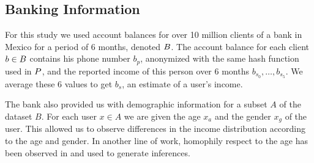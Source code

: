 \subsection{Banking Information}


For this study we used account balances for over 10 million clients of a bank in Mexico for a period of 6 months, denoted \( \mathlarger{B} \). 
The account balance for each client \( b \in \mathlarger{B} \) contains his phone number \( b_p \), anonymized with the same hash function used in \( \mathlarger{P} \), and the reported income of this person over 6 months \( b_{s_0}, \ldots, b_{s_5} \). We average these 6 values to get \( b_s \), an estimate of a user's income.

The bank also provided us with demographic information for a subset \( A \) of the dataset \( B \). For each user \( x \in A \) we are given  the age \( x_a \) and the gender \( x_g \) of the user. This allowed us to observe differences in the income distribution according to the age and gender. In another line of work, homophily respect to the age has been observed in \cite{brea2014} and used to generate inferences.
